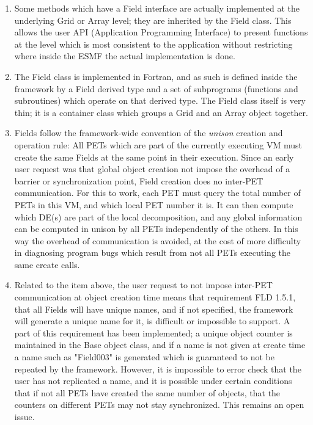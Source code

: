 

\begin{enumerate}

\item Some methods which have a Field interface are actually 
implemented at the underlying Grid or Array level; they
are inherited by the Field class.  This allows the user
API (Application Programming Interface) to present functions at
the level which is most consistent to the application without
restricting where inside the ESMF the actual implementation
is done.

\item The Field class is implemented in Fortran, and as such is
defined inside the framework by a Field derived type and a set of 
subprograms (functions and subroutines) which operate on that derived type.  
The Field class itself is very thin; it is a container class which
groups a Grid and an Array object together.

\item Fields follow the framework-wide convention of the
{\it unison} creation and operation rule: All PETs which are
part of the currently executing VM must create the
same Fields at the same point in their execution.  Since an early
user request was that global object creation not impose the overhead of
a barrier or synchronization point, Field creation does no inter-PET
communication.  For this to work, each PET must query the total number
of PETs in this VM, and which local PET number it is.  It can then
compute which DE(s) are part of the local decomposition, and any
global information can be computed in unison by all PETs independently
of the others.  In this way the overhead of communication is avoided,
at the cost of more difficulty in diagnosing program bugs which result
from not all PETs executing the same create calls.

\item Related to the item above, the user request to not impose
inter-PET communication at object creation time means that requirement
FLD 1.5.1, that all Fields will have unique names, and if not specified, 
the framework will generate a unique name for it, is difficult or
impossible to support.  A part of this requirement has been implemented;
a unique object counter is maintained in the Base object class, and if
a name is not given at create time a name such as "Field003" is generated
which is guaranteed to not be repeated by the framework.   However, it
is impossible to error check that the user has not replicated a name,
and it is possible under certain conditions that if not all PETs have
created the same number of objects, that the counters on different PETs
may not stay synchronized.   This remains an open issue.

\end{enumerate}
